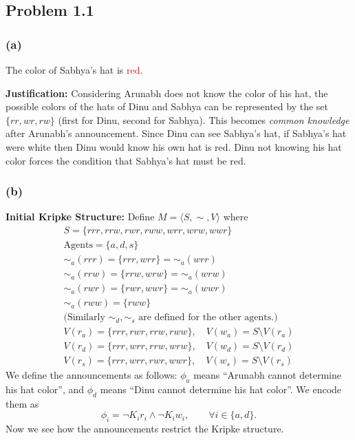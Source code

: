 \subsection*{Problem 1.1}

\subsubsection*{(a)}
The color of Sabhya's hat is \textcolor{red}{red}.

\textbf{Justification:} Considering Arunabh does not know the color 
of his hat, the possible colors of the hats of Dinu and Sabhya 
can be represented by the set \(\{rr, wr, rw\}\) 
(first for Dinu, second for Sabhya). 
This becomes \emph{common knowledge} after Arunabh's announcement. 
Since Dinu can see Sabhya's hat, if Sabhya's hat were white 
then Dinu would know his own hat is red. Dinu not knowing 
his hat color forces the condition that Sabhya's hat must be red.

\subsubsection*{(b)}

\textbf{Initial Kripke Structure:} Define \( M = \langle S,\sim,V \rangle\) where
\begin{gather*}
    S = \{ rrr, rrw, rwr, rww, wrr, wrw, wwr \} \\
    \text{Agents} = \{a,d,s\} \\
    \sim_{a}(rrr) = \{ rrr,wrr \} = \sim_{a}(wrr) \\
    \sim_{a}(rrw) = \{ rrw,wrw \} = \sim_{a}(wrw) \\
    \sim_{a}(rwr) = \{ rwr,wwr \} = \sim_{a}(wwr) \\
    \sim_{a}(rww) = \{ rww \}  \tag{1.1(b1)}\label{eq:1.1(b1)} \\
    \text{(Similarly \(\sim_{d},\sim_{s}\) 
    are defined for the other agents.)} \\
    V(r_{a}) = \{ rrr,rwr,rrw,rww \},\quad
    V(w_{a}) = S \setminus V(r_{a}) \\
    V(r_{d}) = \{ rrr,wrr,rrw,wrw \},\quad
    V(w_{d}) = S \setminus V(r_{d})\\
    V(r_{s}) = \{ rrr,wrr,rwr,wwr \},\quad
    V(w_{s}) = S \setminus V(r_{s})
\end{gather*}
We define the announcements as follows: \(\phi_{a}\) means 
“Arunabh cannot determine his hat color”, and \(\phi_{d}\) 
means “Dinu cannot determine his hat color”. We encode them as
\[
\phi_{i} = \neg K_{i}r_{i} \land \neg K_{i}w_{i},\qquad \forall i \in \{a,d\}.
\]
Now we see how the announcements restrict the Kripke structure.

